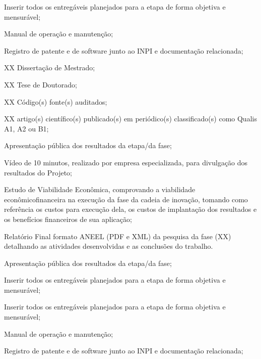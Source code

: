 \xxxx Inserir todos os entregáveis planejados para a etapa de forma objetiva e mensurável;

\xxxx Manual de operação e manutenção;

\xxxx Registro de patente e de software junto ao INPI e documentação relacionada;

\xxxx XX Dissertação de Mestrado;

\xxxx XX Tese de Doutorado;

\xxxx XX Código(s) fonte(s) auditados;

\xxxx XX artigo(s) científico(s) publicado(s) em periódico(s) classificado(s) como Qualis A1, A2 ou B1;

\xxxx Apresentação pública dos resultados da etapa/da fase;

\xxxx Vídeo de 10 minutos, realizado por empresa especializada, para divulgação dos resultados do Projeto;

\xxxx Estudo de Viabilidade Econômica, comprovando a viabilidade econômicofinanceira na execução da fase da cadeia de inovação, tomando como referência os custos para execução  dela, os custos de implantação dos resultados e os benefícios financeiros de sua aplicação;

\xxxx Relatório Final formato ANEEL (PDF e XML) da pesquisa da fase (XX) detalhando as atividades desenvolvidas e as conclusões do trabalho.

\xxx \textbf{}

\xxxx Apresentação pública dos resultados da etapa/da fase;

\xxxx Inserir todos os entregáveis planejados para a etapa de forma objetiva e mensurável;

\xxx \textbf{}

\xxxx Inserir todos os entregáveis planejados para a etapa de forma objetiva e mensurável;

\xxxx Manual de operação e manutenção;

\xxxx Registro de patente e de software junto ao INPI e documentação relacionada;

